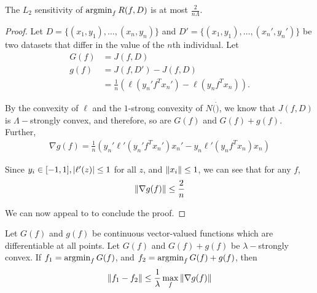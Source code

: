 \documentclass{article} %
\begin{document}
\begin{cor}
The $L_2$ sensitivity of $\operatorname*{argmin}_f R(f, D)$ is at most $\frac{2}{n \Lambda}$.
\label{cor:output_perturb_sensitivity}
\end{cor}
\begin{proof}
Let $D = \{(x_1, y_1), \dots, (x_n, y_n)\}$ and
$D' = \{(x_1, y_1), \dots, (x_n', y_n')\}$
be two datasets that differ in the value of the $n$th individual.
Let
\begin{align*}
G(f) &= J(f, D) \\
g(f) &= J(f, D') - J(f, D) \\
     &= \frac{1}{n} (\ell(y_n' f^T x_n') - \ell(y_n f^T x_n)).
\end{align*}

By the convexity of $\ell$ and the $1$-strong convexity of $N(\dot)$, we know that
$J(f, D)$ is $\Lambda-$strongly convex, and therefore, so are $G(f)$ and
$G(f) + g(f)$.
Further,
\begin{align*}
\nabla g(f)
= \frac{1}{n} \left(y_n' \ell'(y_n' f^T x_n') x_n' - y_n \ell'(y_n f^T x_n) x_n\right)
\end{align*}

Since $y_i \in [-1, 1], \left\lvert\ell'(z)\right\rvert \leq 1$ for all $z$, and
$\left\lVert x_i\right\rVert \leq 1$, we can see that for any $f$,
\begin{align*}
\left\lVert\nabla g(f)\right\rVert \leq \frac{2}{n}
\end{align*}

We can now appeal to  to conclude the
proof.
\end{proof}

\begin{lemma}
Let $G(f)$ and $g(f)$ be continuous vector-valued functions which are
differentiable at all points. Let $G(f)$ and $G(f) + g(f)$ be $\lambda-$strongly
convex. If $f_1 = \operatorname*{argmin}_f G(f)$, and $f_2 = \operatorname*{argmin}_f G(f) + g(f)$, then
\begin{align*}
\left\lVert f_1 - f_2\right\rVert \leq \frac{1}{\lambda} \max_f \left\lVert\nabla g(f)\right\rVert
\end{align*}
\label{lemma:strong_convex_sensitivity}
\end{lemma}
\end{document}
